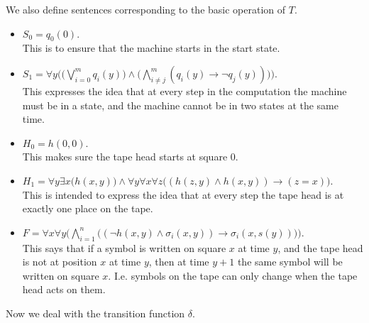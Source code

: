 \documentclass{article}
\theoremstyle{plain}
\theoremstyle{definition}
\newcommand{\ra}{\rightarrow}
\begin{document}
We also define sentences corresponding to the basic operation of $T$.
\begin{itemize}
\item $S_0=q_0(0)$.\\
This is to ensure that the machine starts in the start state. 
\item $S_1=\forall y \Big(\big(\bigvee_{i=0}^m q_i(y)\big)\wedge \big(\bigwedge_{i\neq j}^m (q_i(y)\ra \neg q_j(y))\big)\Big)$.\\
This expresses the idea that at every step in the computation the machine must be in a state, and the machine cannot be in two states at the same time.
\item $H_0 = h(0,0)$.\\
This makes sure the tape head starts at square 0.
\item $H_1 = \forall y\exists x \big(h(x,y)\big) \wedge \forall y \forall x \forall z\big((h(z,y) \wedge h(x,y))\ra (z=x)\big)$.\\
This is intended to express the idea that at every step the tape head is at exactly one place on the tape.
\item $F=\forall x\forall y\Big(\bigwedge _{i=1}^n \big((\neg h(x,y)\wedge \sigma_i(x,y))\ra \sigma_i(x,s(y))\big)\Big)$.\\
This says that if a symbol is written on square $x$ at time $y$, and the tape head is not at position $x$ at time $y$, then at time $y+1$ the same symbol will be written on square $x$. I.e. symbols on the tape can only change when the tape head acts on them.
\end{itemize}
Now we deal with the transition function $\delta$.
\end{document}
